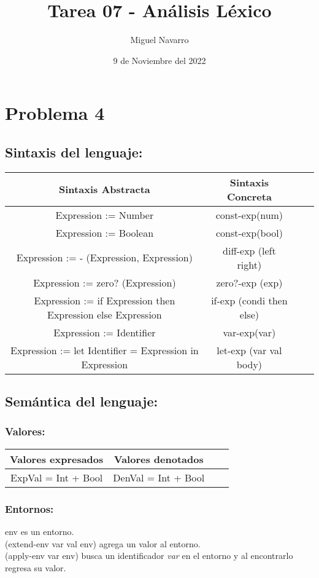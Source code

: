 \documentclass[11pt]{article}
\title{ Tarea 07 - Análisis Léxico}
\author{ Miguel Navarro }
\date{9 de Noviembre del 2022}
\begin{document}
\maketitle	


\section*{Problema 4}
\subsection*{Sintaxis del lenguaje:}
\begin{tabular}{ |c|c|c|c| } 
\hline
Sintaxis Abstracta & Sintaxis Concreta \\
\hline 
Expression := Number & const-exp(num)\\
Expression := Boolean & const-exp(bool)\\
Expression := - (Expression, Expression) & diff-exp (left right)  \\ 
Expression := zero? (Expression) & zero?-exp (exp) \\
Expression := if Expression then Expression else Expression & if-exp (condi then else) \\
Expression := Identifier & var-exp(var)\\
Expression := let Identifier = Expression in Expression & let-exp (var val body)\\
\hline
\end{tabular}
\subsection*{Semántica del lenguaje:}
\subsubsection*{Valores:}
\begin{center}
\begin{tabular}{ |c|c|c|c| } 
\hline
Valores expresados & Valores denotados\\
\hline 
ExpVal = Int + Bool & DenVal = Int + Bool\\
\hline
\end{tabular}
\end{center}
\subsubsection*{Entornos:}
\begin{center}
env es un entorno.\\
(extend-env var val env) agrega un valor al entorno.\\
(apply-env var env) busca un identificador \textit{var} en el entorno y al encontrarlo regresa su valor.\\
\end{center}
\end{document}
